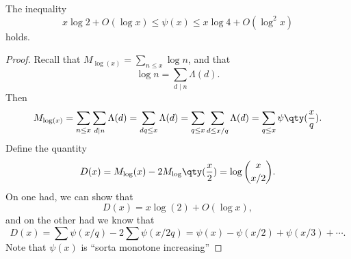 \begin{theorem}[Chebyshev]
The inequality 
\[ x \log 2 + O(\log x) \leq \psi(x) \leq x\log 4 + O(\log^2x) \] holds.
\end{theorem}

\begin{proof}
Recall that $M_{\log(x)} = \sum_{n \leq x} \log n$, and that 
\[ \log n = \sum_{d \mid n} \Lambda(d). \]
Then 
\[ M_{\log(x)} = \sum_{n \leq x} \sum_{d \mid n} \Lambda(d) = \sum_{dq \leq x} \Lambda(d) = \sum_{q \leq x}\sum_{d \leq x/q} \Lambda(d) = \sum_{q \leq x} \psi\qty(\frac{x}{q}). \]
Define the quantity
\[ D(x) = M_{\log}(x) - 2M_{\log}\qty(\frac{x}{2}) = \log {x \choose x/2}. \]
On one had, we can show that 
\[ D(x) = x\log(2) + O(\log x), \]
and on the other had we know that 
\[ D(x) = \sum \psi(x/q) - 2\sum\psi(x/2q) = \psi(x) - \psi(x/2) + \psi(x/3) + \cdots. \]
Note that $\psi(x)$ is ``sorta monotone increasing''
\end{proof}